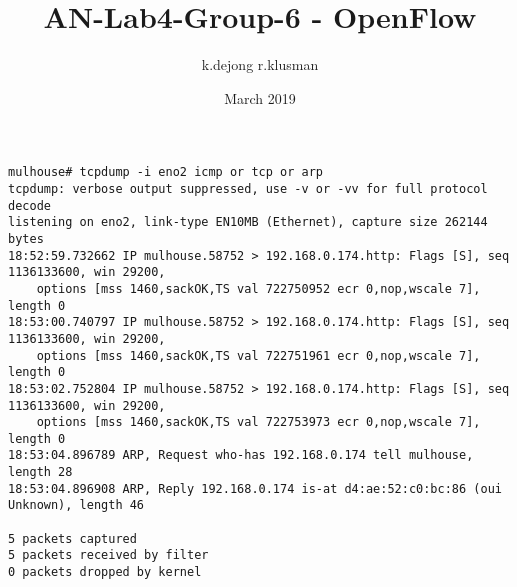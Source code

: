 \documentclass{article}
\title{AN-Lab4-Group-6 - OpenFlow}
\author{k.dejong r.klusman}
\date{March 2019}
\begin{document}
\maketitle
\tableofcontents
\clearpage

\begin{lstlisting}
mulhouse# tcpdump -i eno2 icmp or tcp or arp
tcpdump: verbose output suppressed, use -v or -vv for full protocol decode
listening on eno2, link-type EN10MB (Ethernet), capture size 262144 bytes
18:52:59.732662 IP mulhouse.58752 > 192.168.0.174.http: Flags [S], seq 1136133600, win 29200, 
    options [mss 1460,sackOK,TS val 722750952 ecr 0,nop,wscale 7], length 0
18:53:00.740797 IP mulhouse.58752 > 192.168.0.174.http: Flags [S], seq 1136133600, win 29200, 
    options [mss 1460,sackOK,TS val 722751961 ecr 0,nop,wscale 7], length 0
18:53:02.752804 IP mulhouse.58752 > 192.168.0.174.http: Flags [S], seq 1136133600, win 29200, 
    options [mss 1460,sackOK,TS val 722753973 ecr 0,nop,wscale 7], length 0
18:53:04.896789 ARP, Request who-has 192.168.0.174 tell mulhouse, length 28
18:53:04.896908 ARP, Reply 192.168.0.174 is-at d4:ae:52:c0:bc:86 (oui Unknown), length 46

5 packets captured
5 packets received by filter
0 packets dropped by kernel
\end{lstlisting}

\printbibliography
\end{document}
